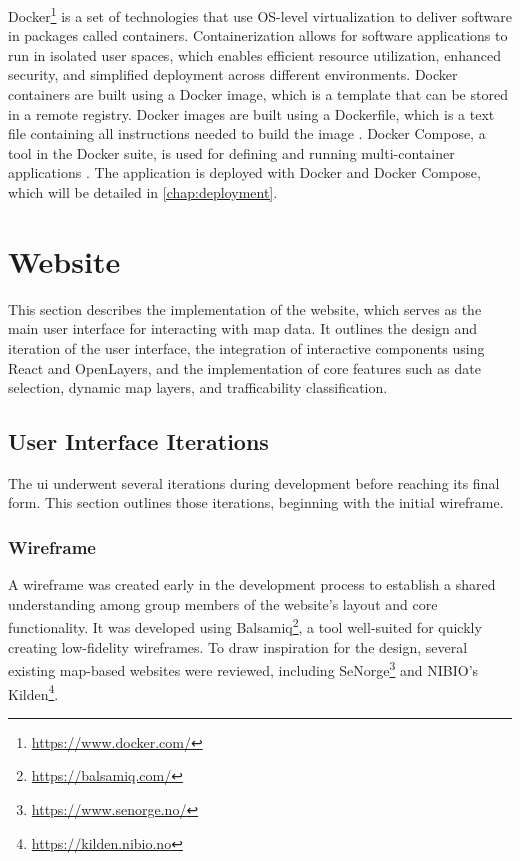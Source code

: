 Docker\footnote{\url{https://www.docker.com/}} is a set of technologies that use OS-level virtualization to deliver software in packages called containers. Containerization allows for software applications to run in isolated user spaces, which enables efficient resource utilization, enhanced security, and simplified deployment across different environments. Docker containers are built using a Docker image, which is a template that can be stored in a remote registry. Docker images are built using a Dockerfile, which is a text file containing all instructions needed to build the image \cite{containerizationwikipedia,dockerwikipedia}. Docker Compose, a tool in the Docker suite, is used for defining and running multi-container applications \cite{dockercomposedocs}. The application is deployed with Docker and Docker Compose, which will be detailed in \autoref{chap:deployment}.

\section{Website}

This section describes the implementation of the website, which serves as the main user interface for interacting with map data. It outlines the design and iteration of the user interface, the integration of interactive components using React and OpenLayers, and the implementation of core features such as date selection, dynamic map layers, and trafficability classification.

\subsection{User Interface Iterations}

The \acrfull{ui} underwent several iterations during development before reaching its final form. This section outlines those iterations, beginning with the initial wireframe.

\subsubsection*{Wireframe}

A wireframe was created early in the development process to establish a shared understanding among group members of the website's layout and core functionality. It was developed using Balsamiq\footnote{\url{https://balsamiq.com/}}, a tool well-suited for quickly creating low-fidelity wireframes. To draw inspiration for the design, several existing map-based websites were reviewed, including SeNorge\footnote{\url{https://www.senorge.no/}} and NIBIO's Kilden\footnote{\url{https://kilden.nibio.no}}.


